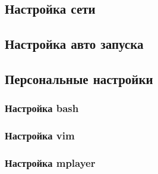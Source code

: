 \documentclass[12pt, a4paper]{article}
\begin{document}
\subsection{Настройка сети}

\subsection{Настройка авто запуска}


\subsection{Персональные настройки}

\subsubsection{Настройка bash}

\subsubsection{Настройка vim}

\subsubsection{Настройка mplayer}
\end{document}
